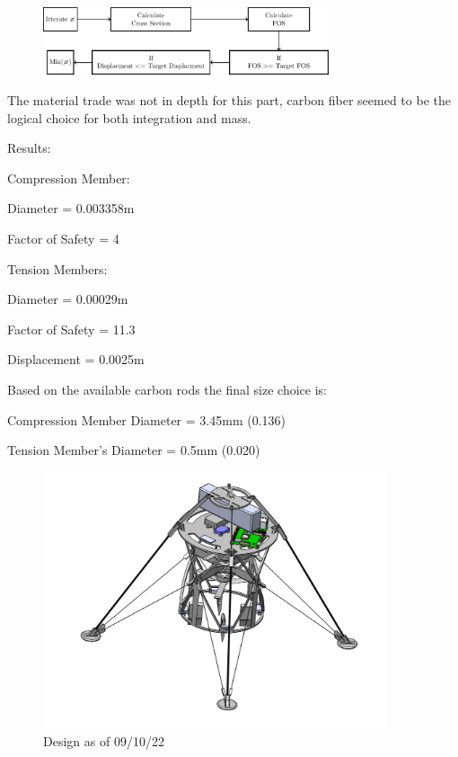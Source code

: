 \documentclass[12pt,letterpaper]{article}
\begin{document}
\begin{figure}[h!]
\centering
\includegraphics[width = 0.75\textwidth]{Landing_Legs_Fig/Landing_Leg_Optimization_Logic.pdf}
\end{figure}


The material trade was not in depth for this part, carbon fiber seemed to be the logical choice for both integration and mass.

Results:

\begin{description}
\item Compression Member:
    \begin{description}
        \item Diameter =  0.003358\unit{\m}
        \item Factor of Safety = 4
    \end{description}
\item Tension Members:
    \begin{description}
        \item Diameter = 0.00029\unit{\m}
        \item Factor of Safety = 11.3
        \item Displacement = 0.0025\unit{\m} 
    \end{description}
\end{description}

Based on the available carbon rods the final size choice is:

\begin{description}
	\item Compression Member Diameter = 3.45\unit{\mm} (0.136\unit{\inch})
	\item Tension Member's Diameter = 0.5\unit{\mm} (0.020\unit{\inch})
\end{description}

\pagebreak

\begin{figure}[h!]
\centering
\includegraphics[width = 0.9\textwidth]{Landing_Legs_Fig/End.png}
\caption*{Design as of 09/10/22}
\end{figure}
\end{document}
